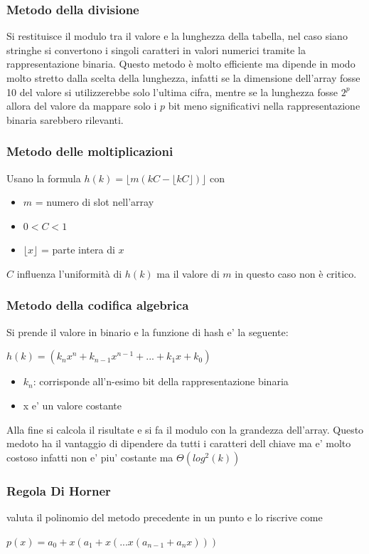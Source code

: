 \documentclass{article}
\begin{document}
\subsubsection{Metodo della divisione}
Si restituisce il modulo tra il valore e la lunghezza della tabella, nel caso siano stringhe si convertono i singoli caratteri in valori numerici tramite la rappresentazione binaria. 
Questo metodo è molto efficiente ma dipende in modo molto stretto dalla scelta della lunghezza, infatti se la dimensione dell'array fosse 10 del valore si utilizzerebbe solo l'ultima cifra, mentre se la lunghezza fosse $2^p$ allora del valore da mappare solo i $p$ bit meno significativi nella rappresentazione binaria sarebbero rilevanti.

\subsubsection{Metodo delle moltiplicazioni}
Usano la formula $h(k) = \lfloor m(kC-\lfloor kC\rfloor)\rfloor$ con \begin{itemize}
    \item $m$ = numero di slot nell'array
    \item $0 < C < 1$
    \item $\lfloor x\rfloor$ = parte intera di $x$
\end{itemize}
$C$ influenza l'uniformità di $h(k)$ ma il valore di $m$ in questo caso non è critico.

\subsubsection{Metodo della codifica algebrica}
Si prende il valore in binario e la funzione di hash e' la seguente:
\begin{center}
    $h(k)=(k_nx^n+k_{n-1}x^{n-1}+ ... +k_1x+k_0)$
\end{center}
\begin{itemize}
    \item \textbf{$k_n$}: corrisponde all'n-esimo bit della rappresentazione binaria
    \item x e' un valore costante
\end{itemize}
Alla fine si calcola il risultate e si fa il modulo con la grandezza dell'array. Questo medoto ha il vantaggio di dipendere da tutti i caratteri dell chiave ma e' molto costoso infatti non e' piu' costante ma $\Theta(log^2(k))$

\subsubsection{Regola Di Horner}
valuta il polinomio del metodo precedente in un punto e lo riscrive come 
\begin{center}
    $p(x) = a_0+x(a_1+x(...x(a_{n-1}+a_nx)))$
\end{center}
\end{document}
